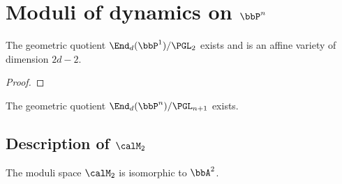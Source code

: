 \section[Moduli of dynamics on projective space]{Moduli of dynamics on $\bbP^n$}




\begin{theorem}
	The geometric quotient $\End_d(\bbP^1) / \PGL_2$ exists and is an affine variety of dimension $2d - 2$.
\end{theorem}
\begin{proof}
	\Yang{}
\end{proof}



\begin{theorem}
	The geometric quotient $\End_d(\bbP^n) / \PGL_{n+1}$ exists.
\end{theorem}







\subsection[Description of M\_2]{Description of $\calM_2$}


\begin{theorem}
	The moduli space $\calM_2$ is isomorphic to $\bbA^2$.
\end{theorem}



















